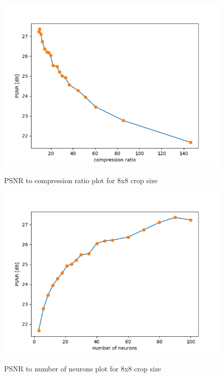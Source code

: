 \documentclass[../IDP_Task5_Karwowski_Kowalewski.tex]{subfiles}
\begin{document}
{{        \begin{figure}[!htbp]
            \centering
            \includegraphics[width=\textwidth]{img/kowalewski/compression_8.png}
            \label{fig:compression_8}
            \caption{PSNR to compression ratio plot for 8x8 crop size}
        \end{figure}

        \begin{figure}[!htbp]
            \centering
            \includegraphics[width=\textwidth]{img/kowalewski/neurons_8.png}
            \label{fig:neurons_8}
            \caption{PSNR to number of neurons plot for 8x8 crop size}
        \end{figure}
        \FloatBarrier
    }

}
\end{document}
